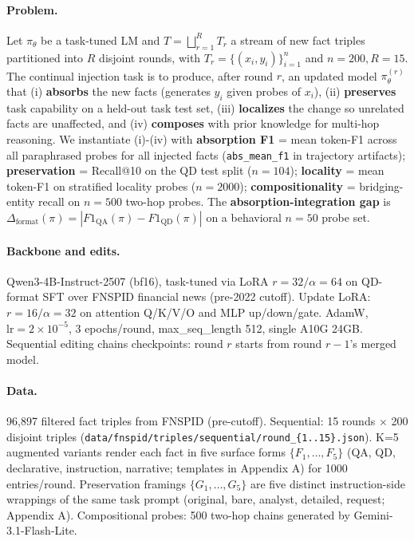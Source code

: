 \documentclass[11pt]{article}
\newcommand{\code}[1]{\texttt{\small #1}}
\begin{document}
\paragraph{Problem.}
Let $\pi_\theta$ be a task-tuned LM and $T = \bigsqcup_{r=1}^R T_r$ a stream
of new fact triples partitioned into $R$ disjoint rounds, with
$T_r = \{(x_i, y_i)\}_{i=1}^{n}$ and $n=200, R=15$. The continual injection
task is to produce, after round $r$, an updated model $\pi_\theta^{(r)}$
that (i) \textbf{absorbs} the new facts (generates $y_i$ given probes of
$x_i$), (ii) \textbf{preserves} task capability on a held-out task test set,
(iii) \textbf{localizes} the change so unrelated facts are unaffected, and
(iv) \textbf{composes} with prior knowledge for multi-hop reasoning. We
instantiate (i)-(iv) with \textbf{absorption F1} = mean token-F1 across all
paraphrased probes for all injected facts (\code{abs\_mean\_f1} in
trajectory artifacts); \textbf{preservation} = Recall@10 on the QD test
split ($n=104$); \textbf{locality} = mean token-F1 on stratified locality
probes ($n=2000$); \textbf{compositionality} = bridging-entity recall on
$n=500$ two-hop probes. The \textbf{absorption-integration gap} is
$\Delta_{\mathrm{format}}(\pi) = | F1_{\mathrm{QA}}(\pi) -
F1_{\mathrm{QD}}(\pi) |$ on a behavioral $n=50$ probe set.

\paragraph{Backbone and edits.}
Qwen3-4B-Instruct-2507 (bf16), task-tuned via LoRA $r=32 / \alpha=64$ on
QD-format SFT over FNSPID financial news (pre-2022 cutoff). Update LoRA:
$r=16 / \alpha=32$ on attention Q/K/V/O and MLP up/down/gate. AdamW,
$\mathrm{lr}=2 \times 10^{-5}$, 3 epochs/round, max\_seq\_length 512, single
A10G 24GB. Sequential editing chains checkpoints: round $r$ starts from
round $r-1$'s merged model.

\paragraph{Data.}
96{,}897 filtered fact triples from FNSPID (pre-cutoff). Sequential: 15
rounds $\times$ 200 disjoint triples
(\code{data/fnspid/triples/sequential/round\_\{1..15\}.json}). K=5
augmented variants render each fact in five surface forms
$\{F_1, \dots, F_5\}$ (QA, QD, declarative, instruction, narrative;
templates in Appendix A) for 1000 entries/round. Preservation framings
$\{G_1, \dots, G_5\}$ are five distinct instruction-side wrappings of the
same task prompt (original, bare, analyst, detailed, request; Appendix A).
Compositional probes: 500 two-hop chains generated by Gemini-3.1-Flash-Lite.
\end{document}
